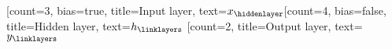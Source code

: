 \begin{neuralnetwork}[height=3.4, layerspacing=30mm]
  \newcommand{\x}[2]{$x_#2$}
  \newcommand{\y}[2]{$y_#2$}
  \newcommand{\hfirst}[2]{\small $h_#2$}
  [count=3, bias=true, title=Input layer, text=\x]
  \hiddenlayer[count=4, bias=false, title=Hidden layer, text=\hfirst] \linklayers
  \outputlayer[count=2, title=Output layer, text=\y] \linklayers
\end{neuralnetwork}
